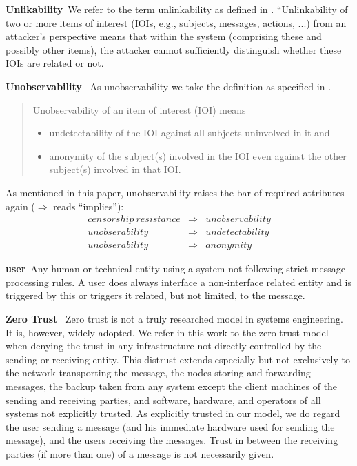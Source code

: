 \documentclass[a4paper,appendixprefix,pdfusetitle,twocolumn,fontsize=8pt,draft,DIV=calc,8pt]{\doctype} %
\newenvironment{entry}{\par\leavevmode\hangpara{1.5mm}{1}\ignorespaces}{\RaggedRight\par}
\newcommand*{\mainentry}[2]{{\bfseries{#1\label{def:#1}}}~#2\par}
\begin{document}
\begin{entry}
	\mainentry{Unlikability}{We refer to the term unlinkability as defined in \cite{anonTerminology}. ``Unlinkability of two or more items of interest (IOIs, e.g., subjects, messages, actions, ...) from an attacker’s perspective means that within the system (comprising these and possibly other items), the attacker cannot sufficiently distinguish whether these IOIs are 
		related or not.}
\end{entry}

\begin{entry}
	\mainentry{Unobservability}{
		As unobservability we take the definition as specified in \cite{anonTerminology}.
		\begin{quote}
			Unobservability of an item of interest (IOI) means
			\begin{itemize}
				\item undetectability of the IOI against all subjects uninvolved in it and
				\item anonymity of the subject(s) involved in the IOI even against the other subject(s) involved in that IOI.
			\end{itemize}
		\end{quote}        
		As mentioned in this paper, unobservability raises the bar of required attributes again ($\Rightarrow$ reads ``implies''):
		\begin{eqnarray*}
			censorship\ resistance & \Rightarrow & unobservability\\
			unobserability         & \Rightarrow & undetectability\\
			unobserability         & \Rightarrow & anonymity
		\end{eqnarray*}
	}
\end{entry}


\begin{entry}
	\mainentry{user}{Any human or technical entity using a system not following strict message processing rules. A user does always interface a non-interface related entity and is triggered by this or triggers it related, but not limited, to the message.}
\end{entry}

\begin{entry}
	\mainentry{Zero Trust}{
		Zero trust is not a truly researched model in systems engineering. It is, however, widely adopted. We refer in this work to the zero trust model when denying the trust in any infrastructure not directly controlled by the sending or receiving entity. This distrust extends especially but not exclusively to the network transporting the message, the nodes storing and forwarding messages, the backup taken from any system except the client machines of the sending and receiving parties, and software, hardware, and operators of all systems not explicitly trusted. As explicitly trusted in our model, we do regard the user sending a message (and his immediate hardware used for sending the message), and the users receiving the messages. Trust in between the receiving parties (if more than one) of a message is not necessarily given.
	}
\end{entry}        
\end{document}
